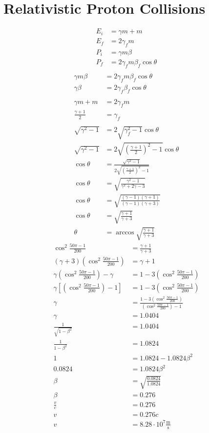 \documentclass[11pt,letterpaper, twocolumn]{article}
\begin{document}
\section{Relativistic Proton Collisions}
\begin{align*}
    E_i &= \gamma m + m\\
    E_f &= 2\gamma_f m\\
    P_i &= \gamma m \beta\\
    P_f &= 2\gamma_f m \beta_f \cos\theta\\
\end{align*}
\begin{align*}
    \gamma m \beta &= 2 \gamma_f m \beta_f \cos\theta\\
    \gamma \beta &= 2 \gamma_f \beta_f \cos\theta\\\\
    \gamma m + m &= 2 \gamma_f m\\
    \frac{\gamma+1}{2} &= \gamma_f\\\\
    \sqrt{\gamma^2 - 1} &= 2\sqrt{\gamma_f^2 - 1}\cos\theta\\
    \sqrt{\gamma^2 - 1} &= 2\sqrt{\left(\frac{\gamma+1}{2}\right)^2 - 1}\cos\theta\\
    \cos \theta &= \frac{\sqrt{\gamma^2 - 1}}{2\sqrt{\left(\frac{\gamma+1}{2}\right)^2 - 1}}\\
    \cos \theta &= \sqrt{\frac{\gamma^2 - 1}{\gamma^2  + 2\gamma -3}}\\
    \cos \theta &= \sqrt{\frac{(\gamma - 1)(\gamma +1)}{(\gamma - 1 ) (\gamma +3)}}\\
    \cos \theta &= \sqrt{\frac{\gamma +1}{\gamma +3}}\\
    \theta &= \arccos \sqrt{\frac{\gamma +1}{\gamma +3}}
\end{align*}
\begin{align*}
    \cos^2 \frac{50\pi-1}{200} &= \frac{\gamma +1}{\gamma +3}\\
    (\gamma +3)\left(\cos^2 \frac{50\pi-1}{200}\right) &= \gamma +1\\
    \gamma\left(\cos^2 \frac{50\pi-1}{200}\right) - \gamma &=1 - 3\left(\cos^2 \frac{50\pi-1}{200}\right) \\
    \gamma\left[\left(\cos^2 \frac{50\pi-1}{200}\right) - 1\right] &=1 - 3\left(\cos^2 \frac{50\pi-1}{200}\right) \\
    \gamma &= \frac{1 - 3\left(\cos^2 \frac{50\pi-1}{200}\right)}{\left(\cos^2 \frac{50\pi-1}{200}\right) - 1} \\
    \gamma &= 1.0404\\
    \frac{1}{\sqrt{1-\beta^2}} &= 1.0404\\
    \frac{1}{1-\beta^2} &= 1.0824\\
    1 &= 1.0824-1.0824\beta^2\\
    0.0824 &= 1.0824\beta^2\\
    \beta &= \sqrt{\frac{0.0824}{1.0824}}\\
    \beta &= 0.276\\
    \frac{v}{c}&=0.276\\
    v&=0.276c\\ 
    v&=8.28\cdot 10^7 \frac{\text{m}}{\text{s}}\\ 
\end{align*}
\end{document}
